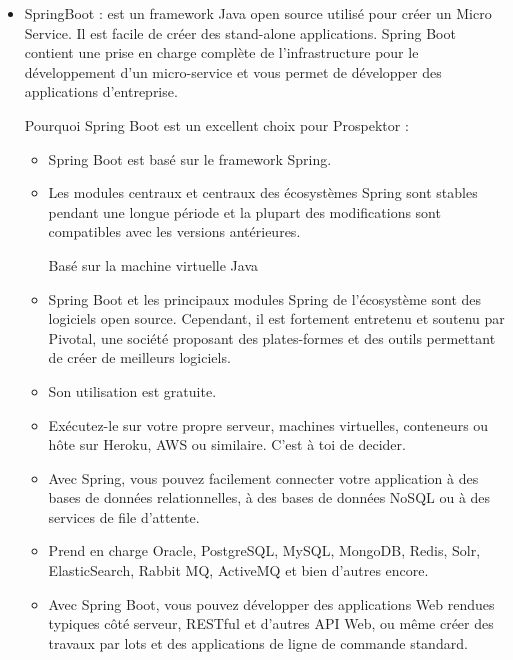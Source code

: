 \begin{itemize}

\item \textcolor{spring}{SpringBoot} : est un framework Java open source utilis\'e pour cr\'eer un Micro Service. Il est facile de cr\'eer des stand-alone applications. Spring Boot contient une prise en charge compl\`ete de l'infrastructure pour le d\'eveloppement d'un micro-service et vous permet de d\'evelopper des applications d'entreprise.

Pourquoi Spring Boot est un excellent choix pour Prospektor :

\begin{itemize}
\item Spring Boot est bas\'e sur le framework Spring.

\item Les modules centraux et centraux des \'ecosyst\`emes Spring sont stables pendant une longue p\'eriode et la plupart des modifications sont compatibles avec les versions ant\'erieures.

Bas\'e sur la machine virtuelle Java

\item Spring Boot et les principaux modules Spring de l'\'ecosyst\`eme sont des logiciels open source. Cependant, il est fortement entretenu et soutenu par Pivotal, une soci\'et\'e proposant des plates-formes et des outils permettant de cr\'eer de meilleurs logiciels.

\item Son utilisation est gratuite.

\item Ex\'ecutez-le sur votre propre serveur, machines virtuelles, conteneurs ou h\^ote sur Heroku, AWS ou similaire. C'est \`a toi de decider.

\item Avec Spring, vous pouvez facilement connecter votre application \`a des bases de donn\'ees relationnelles, \`a des bases de donn\'ees NoSQL ou \`a des services de file d'attente.

\item Prend en charge Oracle, PostgreSQL, MySQL, MongoDB, Redis, Solr, ElasticSearch, Rabbit MQ, ActiveMQ et bien d'autres encore.

\item Avec Spring Boot, vous pouvez d\'evelopper des applications Web rendues typiques c\^ot\'e serveur, RESTful et d'autres API Web, ou m\^eme cr\'eer des travaux par lots et des applications de ligne de commande standard.


\end{itemize}
\end{itemize}
